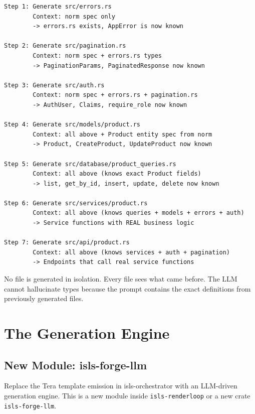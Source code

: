 \documentclass[11pt,a4paper]{article}
\begin{document}
\begin{lstlisting}
Step 1: Generate src/errors.rs
        Context: norm spec only
        -> errors.rs exists, AppError is now known

Step 2: Generate src/pagination.rs
        Context: norm spec + errors.rs types
        -> PaginationParams, PaginatedResponse now known

Step 3: Generate src/auth.rs
        Context: norm spec + errors.rs + pagination.rs
        -> AuthUser, Claims, require_role now known

Step 4: Generate src/models/product.rs
        Context: all above + Product entity spec from norm
        -> Product, CreateProduct, UpdateProduct now known

Step 5: Generate src/database/product_queries.rs
        Context: all above (knows exact Product fields)
        -> list, get_by_id, insert, update, delete now known

Step 6: Generate src/services/product.rs
        Context: all above (knows queries + models + errors + auth)
        -> Service functions with REAL business logic

Step 7: Generate src/api/product.rs
        Context: all above (knows services + auth + pagination)
        -> Endpoints that call real service functions
\end{lstlisting}

No file is generated in isolation. Every file sees what came before.
The LLM cannot hallucinate types because the prompt contains the
exact definitions from previously generated files.

\section{The Generation Engine}

\subsection{New Module: isls-forge-llm}

Replace the Tera template emission in isls-orchestrator with an
LLM-driven generation engine. This is a new module inside
\texttt{isls-renderloop} or a new crate \texttt{isls-forge-llm}.
\end{document}
